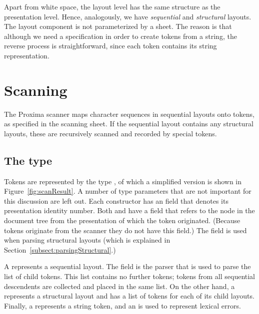 \documentclass[12pt]{article}
\begin{document}
Apart from white space, the layout level has the same structure as the presentation level. Hence, analogously, we have {\em sequential} and {\em structural} layouts. The layout component is not parameterized by a sheet. The reason is that although we need a specification in order to create tokens from a string, the reverse process is straightforward, since each token contains its string representation.  





%
\section{Scanning}\label{sect:scanner}
%

The Proxima scanner maps character sequences in sequential layouts onto tokens, as specified in the scanning sheet. If the sequential layout contains any structural layouts, these are recursively scanned and recorded by special tokens.

\subsection{The  type}

Tokens are represented by the type , of which a simplified version is shown in Figure~\ref{fig:scanResult}. A number of type parameters that are not important for this discussion are left out. Each constructor has an  field that denotes its presentation identity number. Both  and  have a  field that refers to the node in the document tree from the presentation of which the token originated. (Because  tokens originate from the scanner they do not have this field.) The  field is used when parsing structural layouts (which is explained in Section~\ref{subsect:parsingStructural}.) 



A {\bf{}} represents a sequential layout. The field  is the parser that is used to parse the list of child tokens. This list contains no further  tokens; tokens from all sequential descendents are collected and placed in the same list. On the other hand, a {\bf {}} represents a structural layout and has a list of tokens for each of its child layouts. Finally, a {\bf {}} represents a string token, and an {\bf {}} is used to represent lexical errors. %
\end{document}
